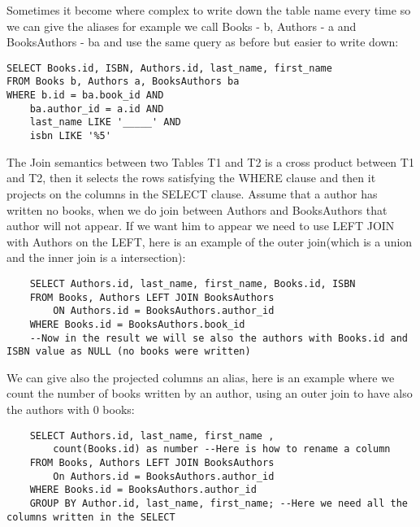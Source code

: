 \documentclass[a4page, 11pt]{article}
\begin{document}
Sometimes it become where complex to write down the table name every time so we can give the aliases for example we call Books - b, Authors - a and BooksAuthors - ba and use the same query as before but easier to write down:
\begin{lstlisting}
SELECT Books.id, ISBN, Authors.id, last_name, first_name
FROM Books b, Authors a, BooksAuthors ba
WHERE b.id = ba.book_id AND
	ba.author_id = a.id AND	
	last_name LIKE '_____' AND
	isbn LIKE '%5'
\end{lstlisting}
The Join semantics between two Tables T1 and T2 is a cross product between T1 and T2, then it selects the rows satisfying the WHERE clause and then it projects on the columns in the SELECT clause.\newline
Assume that a author has written no books, when we do join between Authors and BooksAuthors that author will not appear. 
If we want him to appear we need to use LEFT JOIN with Authors on the LEFT, here is an example of the outer join(which is a union and the inner join is a intersection):
\begin{lstlisting}
	SELECT Authors.id, last_name, first_name, Books.id, ISBN
	FROM Books, Authors LEFT JOIN BooksAuthors
		ON Authors.id = BooksAuthors.author_id
	WHERE Books.id = BooksAuthors.book_id
	--Now in the result we will se also the authors with Books.id and ISBN value as NULL (no books were written)
\end{lstlisting}

We can give also the projected columns an alias, here is an example where we count the number of books written by an author, using an outer join to have also the authors with 0 books:
\begin{lstlisting}
	SELECT Authors.id, last_name, first_name ,
		count(Books.id) as number --Here is how to rename a column
	FROM Books, Authors LEFT JOIN BooksAuthors
		On Authors.id = BooksAuthors.author_id
	WHERE Books.id = BooksAuthors.author_id
	GROUP BY Author.id, last_name, first_name; --Here we need all the columns written in the SELECT
\end{lstlisting}
\pagebreak
\end{document}
